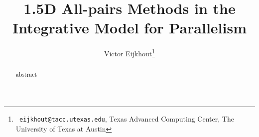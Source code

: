 \documentclass[11pt,fleqn,preprint]{taccreport}
\title[All-pairs methods IMP]{1.5D All-pairs Methods in the Integrative Model for Parallelism}
\author[Eijkhout]{Victor Eijkhout\thanks{{\tt
      eijkhout@tacc.utexas.edu}, Texas Advanced Computing Center, The
    University of Texas at Austin}}
\begin{document}
\maketitle

\begin{abstract}
abstract
\end{abstract}





\end{document}
